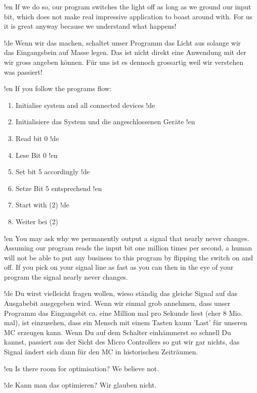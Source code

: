 !en If we do so, our program switches the light off as long as we ground our input bit, which does not make real impressive application to boast around with. For us it is great anyway because we understand what happens!

!de Wenn wir das machen, schaltet unser Programm das Licht aus solange wir das Eingangsbein auf Masse legen. Das ist nicht direkt eine Anwendung mit der wir gross angeben können. Für uns ist es dennoch grossartig weil wir verstehen was passiert!



!en If you follow the programs flow:

\begin{enumerate}
!en   \item Initialise system and all connected devices
!de   \item Initialisiere das System und die angeschlossenen Geräte
!en   \item Read bit 0
!de   \item Lese Bit 0
!en   \item Set bit 5 accordingly
!de   \item Setze Bit 5 entsprechend
!en   \item Start with (2)
!de   \item Weiter bei (2)
\end{enumerate}

!en You may ask why we permanently output a signal that nearly never changes. Assuming our program reads the input bit one million times per second, a human will not be able to put any business to this program by flipping the switch on and off. If you pick on your signal line as fast as you can then in the eye of your program the signal nearly never changes.

!de Du wirst vielleicht fragen wollen, wieso ständig das gleiche Signal auf das Ausgabebit ausgegeben wird. Wenn wir einmal grob annehmen, dass unser Programm das Eingangsbit ca. eine Million mal pro Sekunde liest (eher 8 Mio. mal), ist einzusehen, dass ein Mensch mit einem Tasten kaum 'Last' für unseren MC erzeugen kann. Wenn Du auf dem Schalter einhämmerst so schnell Du kannst, passiert aus der Sicht des Micro Controllers so gut wir gar nichts, das Signal ändert sich dann für den MC in historischen Zeiträumen.


!en Is there room for optimisation? We believe not.

!de Kann man das optimieren? Wir glauben nicht.




